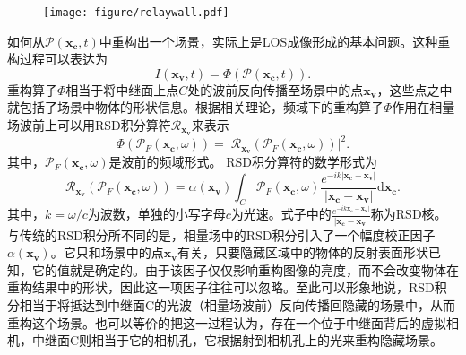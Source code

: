 \documentclass[master]{shtthesis}             %
\begin{document}
\begin{figure}[!tb]
  \centering
  \texttt{[image: figure/relaywall.pdf]}
  \label{fig:rsd_nlos_scene}
\end{figure}

如何从$\mathcal{P}(\mathbf{x_c},t)$中重构出一个场景，实际上是LOS成像形成的基本问题。这种重构过程可以表达为
\begin{equation}\label{eq:recons}
  I(\mathbf{x_v}, t)=\varPhi (\mathcal{P}(\mathbf{x_c},t)).
\end{equation}
重构算子$\varPhi$相当于将中继面上点$C$处的波前反向传播至场景中的点$\mathbf{x_v}$，这些点之中就包括了场景中物体的形状信息。根据相关理论\citep{Teichman2019}，频域下的重构算子$\varPhi$作用在相量场波前上可以用RSD积分算符$\mathcal{R}_{\mathbf{x_v}}$来表示
\begin{equation}\label{eq:recons_freq}
  \varPhi \left( \mathcal{P}_F(\mathbf{x_c},\omega) \right) = \Big| \mathcal{R}_{\mathbf{x_v}} \left( \mathcal{P}_F(\mathbf{x_c},\omega) \right) \Big|^2.
\end{equation}
其中，$\mathcal{P}_F(\mathbf{x_c},\omega)$是波前的频域形式。
RSD积分算符的数学形式为
\begin{equation}\label{eq:rsdint}
  \mathcal{R}_{\mathbf{x_v}} \left( \mathcal{P}_F(\mathbf{x_c},\omega) \right) = \alpha(\mathbf{x_v}) \int_C \mathcal{P}_F(\mathbf{x_c},\omega) \frac{e^{-ik|\mathbf{x_c}-\mathbf{x_v}|}}{|\mathbf{x_c}-\mathbf{x_v}|}\text{d} \mathbf{x_c} .
\end{equation}
其中，$k=\omega/c$为波数，单独的小写字母$c$为光速。式子中的$\frac{e^{-ik\mathbf{x_c}-\mathbf{x_v}|}}{|\mathbf{x_c}-\mathbf{x_v}|}$称为RSD核。与传统的RSD积分所不同的是，相量场中的RSD积分引入了一个幅度校正因子$\alpha(\mathbf{x_v})$。它只和场景中的点$\mathbf{x_v}$有关，只要隐藏区域中的物体的反射表面形状已知，它的值就是确定的。由于该因子仅仅影响重构图像的亮度，而不会改变物体在重构结果中的形状，因此这一项因子往往可以忽略。至此可以形象地说，RSD积分相当于将抵达到中继面C的光波（相量场波前）反向传播回隐藏的场景中，从而重构这个场景。也可以等价的把这一过程认为，存在一个位于中继面背后的虚拟相机，中继面C则相当于它的相机孔，它根据射到相机孔上的光来重构隐藏场景。
\end{document}
